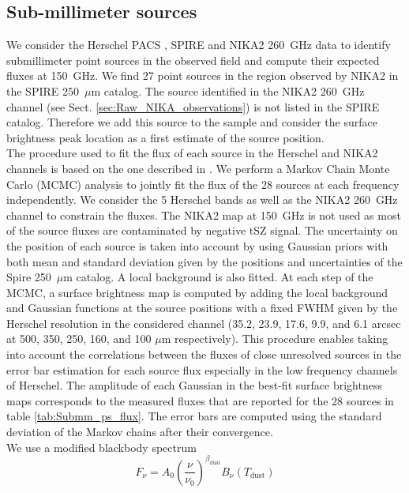 \documentclass[traditabstract]{aa}
\begin{document}
\subsection{Sub-millimeter sources}\label{sec:submm}
We consider the Herschel PACS \citep{pog10}, SPIRE \citep{gri10} and NIKA2 260~GHz data to identify submillimeter point sources in the observed field and compute their expected fluxes at 150~GHz. We find 27 point sources in the region observed by NIKA2 in the SPIRE 250~$\mu$m catalog. The source identified in the NIKA2 260~GHz channel (see Sect. \ref{sec:Raw_NIKA_observations}) is not listed in the SPIRE catalog. Therefore we add this source to the sample and consider the surface brightness peak location as a first estimate of the source position.\\
\indent The procedure used to fit the flux of each source in the Herschel and NIKA2 channels is based on the one described in \cite{ada16a}. We perform a Markov Chain Monte Carlo (MCMC) analysis to jointly fit the flux of the 28 sources at each frequency independently. We consider the 5 Herschel bands as well as the NIKA2 260~GHz channel to constrain the fluxes. The NIKA2 map at 150~GHz is not used as most of the source fluxes are contaminated by negative tSZ signal. The uncertainty on the position of each source is taken into account by using Gaussian priors with both mean and standard deviation given by the positions and uncertainties of the Spire 250~$\mu$m catalog. A local background is also fitted. At each step of the MCMC, a surface brightness map is computed by adding the local background and Gaussian functions at the source positions with a fixed FWHM given by the Herschel resolution in the considered channel (35.2, 23.9, 17.6, 9.9, and 6.1 arcsec at 500, 350, 250, 160, and 100 $\mu$m respectively). This procedure enables taking into account the correlations between the fluxes of close unresolved sources in the error bar estimation for each source flux especially in the low frequency channels of Herschel. The amplitude of each Gaussian in the best-fit surface brightness maps corresponds to the measured fluxes that are reported for the 28 sources in table \ref{tab:Submm_ps_flux}. The error bars are computed using the standard deviation of the Markov chains after their convergence.\\
We use a modified blackbody spectrum
\begin{equation}
F_{\nu} = A_0\left(\frac{\nu}{\nu_0}\right)^{\beta_{\mathrm{dust}}}B_{\nu}(T_{\mathrm{dust}})
\end{equation}
\end{document}
